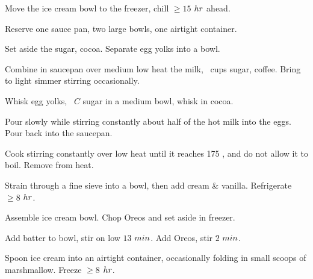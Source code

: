\begin{preparation}
\item Move the ice cream bowl to the freezer, chill $\ge15$ $\hour$ ahead.

\item Reserve one sauce pan, two large bowls, one airtight container.

\item Set aside the sugar, cocoa.
	Separate egg yolks into a bowl.

\item Combine in saucepan over medium low heat the milk, \onehalf~cups sugar, coffee.
	Bring to light simmer stirring occasionally.

\item Whisk egg yolks, \onefourth~$C$ sugar in a medium bowl, whisk in cocoa.

\item Pour slowly while stirring constantly about half of the hot milk into the eggs.
	Pour back into the saucepan.

\item Cook stirring constantly over low heat until it reaches 175 \Fahrenheit, and do not allow it to boil.
	Remove from heat.

\item Strain through a fine sieve into a bowl, then add cream \& vanilla.
	Refrigerate $\ge8$ $\hour$.

\item Assemble ice cream bowl.
	Chop Oreos and set aside in freezer.

\item Add batter to bowl, stir on low $13$ $\minute$.
	Add Oreos, stir $2$ $\minute$.

\item Spoon ice cream into an airtight container, occasionally folding in small scoops of marshmallow.
	Freeze $\ge8$ $\hour$.
\end{preparation}


\recipeend%
